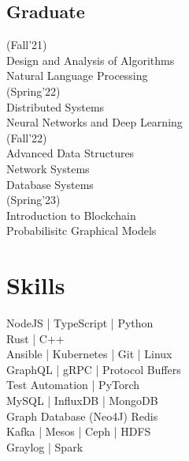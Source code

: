 \documentclass[]{deedy-resume-openfont}
\begin{document}
\begin{minipage}[t]{0.33\textwidth}
\subsection{Graduate}
\vspace{1em}
(Fall'21)\\
\textbullet{} Design and Analysis of Algorithms \\
\textbullet{} Natural Language Processing \\
\vspace{1em}
(Spring'22)\\
\textbullet{} Distributed Systems \\
\textbullet{} Neural Networks and Deep Learning \\
\vspace{1em}
(Fall'22)\\
\textbullet{} Advanced Data Structures \\
\textbullet{} Network Systems \\
\textbullet{} Database Systems \\
\vspace{1em}
(Spring'23)\\
\textbullet{} Introduction to Blockchain \\
\textbullet{} Probabilisitc Graphical Models
\sectionsep


\section{Skills}
\textbullet{} NodeJS | TypeScript | Python \\
\textbullet{} Rust | C++  \\
\vspace{1em}
\textbullet{} Ansible | Kubernetes | Git | Linux\\
\textbullet{} GraphQL | gRPC | Protocol Buffers \\
\textbullet{} Test Automation | PyTorch \\
\vspace{1em}
\textbullet{} MySQL | InfluxDB | MongoDB \\
\textbullet{} Graph Database (Neo4J) \textbullet{} Redis \\
\vspace{1em}
\textbullet{} Kafka | Mesos | Ceph | HDFS \\
\textbullet{} Graylog | Spark \\
\sectionsep

%
%

\end{minipage} 
\end{document}
